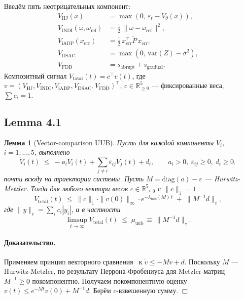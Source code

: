 \documentclass[a4paper,14pt]{extarticle}
\newtheorem{lemma}{Лемма}
\begin{document}
Введём пять неотрицательных компонент:
\begin{align}
V_{\mathrm{HJ}}(x) &= \max\!\left(0,\, \varepsilon_t - V_\theta(x)\right), \\
V_{\mathrm{INDI}}(\omega,\omega_{\mathrm{ref}}) &= \tfrac12\,\|\omega-\omega_{\mathrm{ref}}\|^2, \\
V_{\mathrm{iADP}}(x_{\mathrm{err}}) &= \tfrac12\,x_{\mathrm{err}}^\top \tilde P\, x_{\mathrm{err}}, \\
V_{\mathrm{DSAC}} &= \max\!\left(0,\, \mathrm{var}(Z) - \overline{\sigma}^2\right), \\
V_{\mathrm{FDD}} &= s_{\mathrm{abrupt}} + s_{\mathrm{gradual}}.
\end{align}
Композитный сигнал $V_{\mathrm{total}}(t) = c^\top v(t)$, где
$v = (V_{\mathrm{HJ}}, V_{\mathrm{INDI}}, V_{\mathrm{iADP}}, V_{\mathrm{DSAC}}, V_{\mathrm{FDD}})^\top$,
$c \in \mathbb{R}_{\ge 0}^5$ — фиксированные веса, $\sum c_i = 1$.

\subsection{Lemma 4.1}

\begin{lemma}[Vector-comparison UUB]
\label{lem:vector-uub}
Пусть для каждой компоненты $V_i$, $i=1,\dots,5$, выполнено
\begin{equation}
\dot V_i(t) \;\le\; -a_i V_i(t) + \sum_{j\ne i} \varepsilon_{ij} V_j(t) + d_i,
\qquad a_i>0,\ \varepsilon_{ij}\ge 0,\ d_i\ge 0,
\end{equation}
почти всюду на траектории системы. Пусть $M = \mathrm{diag}(a) - \varepsilon$ — Hurwitz-Metzler.
Тогда для любого вектора весов $c \in \mathbb{R}^5_{\ge 0}$ с $\|c\|_1=1$
\begin{equation}
V_{\mathrm{total}}(t) \;\le\; \|c\|_1 \cdot \|v(0)\|_\infty \cdot e^{-\lambda_{\min}(M)\, t}
\;+\; \|M^{-1} d\|_c,
\end{equation}
где $\|y\|_c = \sum_i c_i |y_i|$, и в частности
\begin{equation}
\limsup_{t\to\infty} V_{\mathrm{total}}(t) \;\le\; \mu_{\mathrm{uub}} \,\equiv\, \|M^{-1} d\|_c.
\end{equation}
\end{lemma}

\paragraph{Доказательство.}
Применяем принцип векторного сравнения~\cite[\S 9.5]{khalil2002} к $\dot v\le -Mv+d$.
Поскольку $M$ — Hurwitz-Metzler, по результату Перрона-Фробениуса для Metzler-матриц
$M^{-1}\ge 0$ покомпонентно. Получаем покомпонентную оценку
$v(t)\le e^{-Mt}v(0)+M^{-1}d$. Берём $c$-взвешенную сумму. \hfill$\Box$
\end{document}
